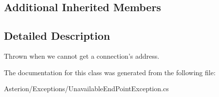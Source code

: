 \subsection*{Additional Inherited Members}


\subsection{Detailed Description}
Thrown when we cannot get a connection's address. 

The documentation for this class was generated from the following file\-:\begin{DoxyCompactItemize}
\item 
Asterion/\-Exceptions/Unavailable\-End\-Point\-Exception.\-cs\end{DoxyCompactItemize}
